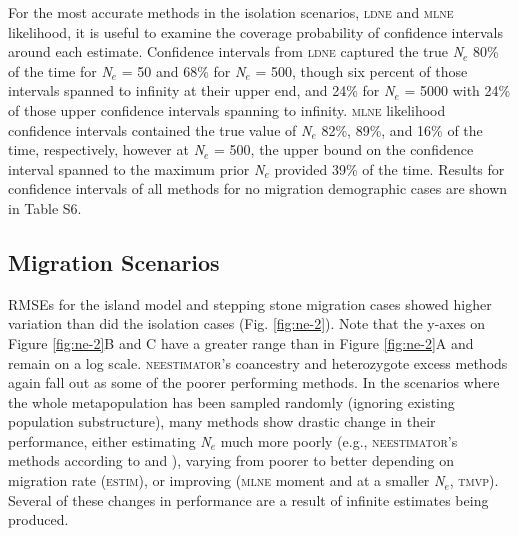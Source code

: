 For the most accurate methods in the isolation scenarios, \textsc{ldne} and \textsc{mlne} 
likelihood, it is useful to examine the coverage probability of confidence intervals around 
each estimate. Confidence intervals from \textsc{ldne} captured the true \emph{N}$_e$ 80\% 
of the time for \emph{N}$_e$ = 50 and 68\% for \emph{N}$_e$ = 500, though six percent of 
those intervals spanned to infinity at their upper end, and 24\% for \emph{N}$_e$ = 5000 with 
24\% of those upper confidence intervals spanning to infinity. \textsc{mlne} likelihood confidence 
intervals contained the true value of \emph{N}$_e$ 82\%, 89\%, and 16\% of the time, respectively, 
however at \emph{N}$_e$ = 500, the upper bound on the confidence interval spanned to the maximum 
prior \emph{N}$_e$ provided 39\% of the time. Results for confidence intervals of all methods 
for no migration demographic cases are shown in Table S6.

\subsection{Migration Scenarios}
RMSEs for the island model and stepping stone migration cases showed higher variation than did 
the isolation cases (Fig. \ref{fig:ne-2}). Note that the y-axes on Figure \ref{fig:ne-2}B and C have a greater range than 
in Figure \ref{fig:ne-2}A and remain on a log scale. \textsc{neestimator}'s coancestry and heterozygote excess 
methods again fall out as some of the poorer performing methods. In the scenarios where the whole 
metapopulation has been sampled randomly (ignoring existing population substructure), many methods 
show drastic change in their performance, either estimating \emph{N}$_e$ much more poorly (e.g., 
\textsc{neestimator}'s methods according to \citet{Pollak:1983} and \citet{Nei:1981}), varying from 
poorer to better depending on migration rate (\textsc{estim}), or improving (\textsc{mlne} moment and at a 
smaller \emph{N}$_e$, \textsc{tmvp}). Several of these changes in performance are a result of 
infinite estimates being produced.

